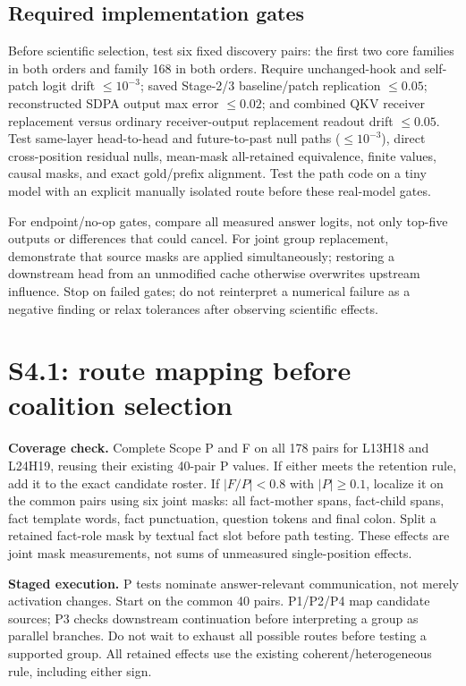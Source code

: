 \documentclass[11pt,a4paper]{article}
\begin{document}
\subsection{Required implementation gates}
Before scientific selection, test six fixed discovery pairs: the first two core
families in both orders and family 168 in both orders. Require unchanged-hook and
self-patch logit drift $\le10^{-3}$; saved Stage-2/3 baseline/patch replication
$\le0.05$; reconstructed SDPA output max error $\le0.02$; and combined QKV receiver
replacement versus ordinary receiver-output replacement readout drift $\le0.05$.
Test same-layer head-to-head and future-to-past null paths ($\le10^{-3}$), direct
cross-position residual nulls, mean-mask all-retained equivalence, finite values,
causal masks, and exact gold/prefix alignment. Test the path code on a tiny model
with an explicit manually isolated route before these real-model gates.

For endpoint/no-op gates, compare all measured answer logits, not only top-five
outputs or differences that could cancel. For joint group replacement, demonstrate
that source masks are applied simultaneously; restoring a downstream head from an
unmodified cache otherwise overwrites upstream influence. Stop on failed gates;
do not reinterpret a numerical failure as a negative finding or relax tolerances
after observing scientific effects.

\section{S4.1: route mapping before coalition selection}
\label{sec:routes}
\textbf{Coverage check.} Complete Scope P and F on all 178 pairs for L13H18 and
L24H19, reusing their existing 40-pair P values. If either meets the retention rule,
add it to the exact candidate roster. If $|F/P|<0.8$ with $|P|\ge0.1$, localize it
on the common pairs using six joint masks: all fact-mother spans, fact-child spans,
fact template words, fact punctuation, question tokens and final colon. Split a
retained fact-role mask by textual fact slot before path testing. These effects are
joint mask measurements, not sums of unmeasured single-position effects.


\textbf{Staged execution.} P tests nominate answer-relevant communication, not merely
activation changes. Start on the common 40 pairs. P1/P2/P4 map candidate sources;
P3 checks downstream continuation before interpreting a group as parallel branches.
Do not wait to exhaust all possible routes before testing a supported group.
All retained effects use the existing coherent/heterogeneous rule, including either sign.
\end{document}
